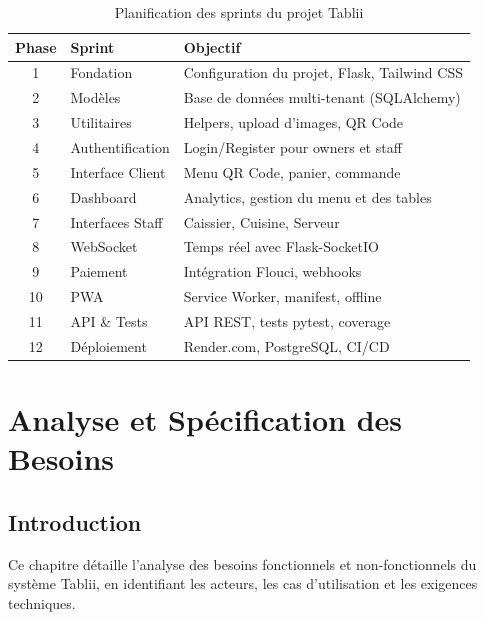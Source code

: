 \documentclass[12pt,a4paper]{report}
\begin{document}
\begin{table}[H]
    \centering
    \begin{tabularx}{\textwidth}{c l X}
        \toprule
        \rowcolor{primary!10}
        \textbf{Phase} & \textbf{Sprint} & \textbf{Objectif} \\
        \midrule
        1 & Fondation & Configuration du projet, Flask, Tailwind CSS \\
        2 & Modèles & Base de données multi-tenant (SQLAlchemy) \\
        3 & Utilitaires & Helpers, upload d'images, QR Code \\
        4 & Authentification & Login/Register pour owners et staff \\
        5 & Interface Client & Menu QR Code, panier, commande \\
        6 & Dashboard & Analytics, gestion du menu et des tables \\
        7 & Interfaces Staff & Caissier, Cuisine, Serveur \\
        8 & WebSocket & Temps réel avec Flask-SocketIO \\
        9 & Paiement & Intégration Flouci, webhooks \\
        10 & PWA & Service Worker, manifest, offline \\
        11 & API \& Tests & API REST, tests pytest, coverage \\
        12 & Déploiement & Render.com, PostgreSQL, CI/CD \\
        \bottomrule
    \end{tabularx}
    \caption{Planification des sprints du projet Tablii}
    \label{tab:sprints}
\end{table}

\cleardoublepage
\chapter{Analyse et Spécification des Besoins}

\section{Introduction}

Ce chapitre détaille l'analyse des besoins fonctionnels et non-fonctionnels du système Tablii, en identifiant les acteurs, les cas d'utilisation et les exigences techniques.
\end{document}
